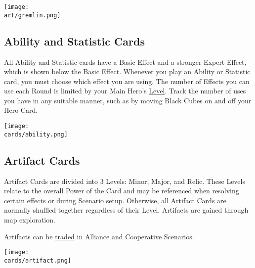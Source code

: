 \begin{multicols*}{2}
\vspace*{\fill}
\begin{center}
  \hspace{3em}
  \texttt{[image: \\art/gremlin.png]}
\end{center}

\clearpage

\subsection*{\hypertarget{Ability}{Ability and Statistic Cards}}

All Ability and Statistic cards have a Basic Effect and a stronger Expert  Effect, which is shown below the Basic Effect.
Whenever you play an Ability or Statistic card, you must choose which effect you are using.
The number of  Effects you can use each Round is limited by your Main Hero's \hyperlink{Level}{Level}.
Track the number of uses you have in any suitable manner, such as by moving Black Cubes on and off your Hero Card.\par
\bigskip

\texttt{[image: \\cards/ability.png]}


\subsection*{Artifact Cards}
Artifact Cards are divided into 3 Levels: Minor, Major, and Relic.
These Levels relate to the overall Power of the Card and may be referenced when resolving certain effects or during Scenario setup.
Otherwise, all Artifact Cards are normally shuffled together regardless of their Level.
Artifacts are gained through map exploration.\par
Artifacts can be \hyperlink{Trading}{traded} in Alliance and Cooperative Scenarios.\par
\texttt{[image: \\cards/artifact.png]}


\end{multicols*}
